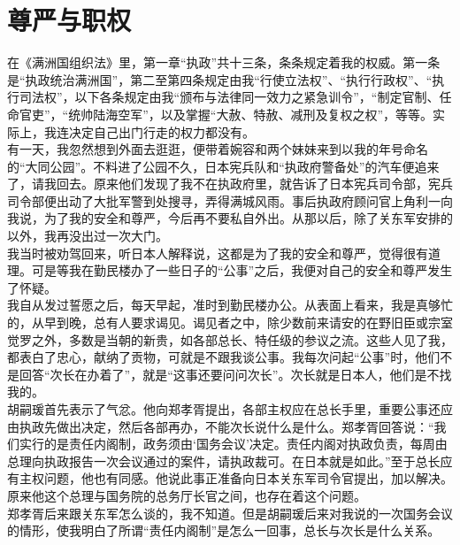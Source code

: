 \fancyhead[RO]{} %
\fancyhead[LE]{} %
\chapter*{尊严与职权}
\thispagestyle{empty}
在《满洲国组织法》里，第一章“执政”共十三条，条条规定着我的权威。第一条是“执政统治满洲国”，第二至第四条规定由我“行使立法权”、“执行行政权”、“执行司法权”，以下各条规定由我“颁布与法律同一效力之紧急训令”，“制定官制、任命官吏”，“统帅陆海空军”，以及掌握“大赦、特赦、减刑及复权之权”，等等。实际上，我连决定自己出门行走的权力都没有。\\

有一天，我忽然想到外面去逛逛，便带着婉容和两个妹妹来到以我的年号命名的“大同公园”。不料进了公园不久，日本宪兵队和“执政府警备处”的汽车便追来了，请我回去。原来他们发现了我不在执政府里，就告诉了日本宪兵司令部，宪兵司令部便出动了大批军警到处搜寻，弄得满城风雨。事后执政府顾问官上角利一向我说，为了我的安全和尊严，今后再不要私自外出。从那以后，除了关东军安排的以外，我再没出过一次大门。\\

我当时被劝驾回来，听日本人解释说，这都是为了我的安全和尊严，觉得很有道理。可是等我在勤民楼办了一些日子的“公事”之后，我便对自己的安全和尊严发生了怀疑。\\

我自从发过誓愿之后，每天早起，准时到勤民楼办公。从表面上看来，我是真够忙的，从早到晚，总有人要求谒见。谒见者之中，除少数前来请安的在野旧臣或宗室觉罗之外，多数是当朝的新贵，如各部总长、特任级的参议之流。这些人见了我，都表白了忠心，献纳了贡物，可就是不跟我谈公事。我每次问起“公事”时，他们不是回答“次长在办着了”，就是“这事还要问问次长”。次长就是日本人，他们是不找我的。\\

胡嗣瑗首先表示了气忿。他向郑孝胥提出，各部主权应在总长手里，重要公事还应由执政先做出决定，然后各部再办，不能次长说什么是什么。郑孝胥回答说：“我们实行的是责任内阁制，政务须由‘国务会议’决定。责任内阁对执政负责，每周由总理向执政报告一次会议通过的案件，请执政裁可。在日本就是如此。”至于总长应有主权问题，他也有同感。他说此事正准备向日本关东军司令官提出，加以解决。原来他这个总理与国务院的总务厅长官之间，也存在着这个问题。\\

郑孝胥后来跟关东军怎么谈的，我不知道。但是胡嗣瑗后来对我说的一次国务会议的情形，使我明白了所谓“责任内阁制”是怎么一回事，总长与次长是什么关系。\\

